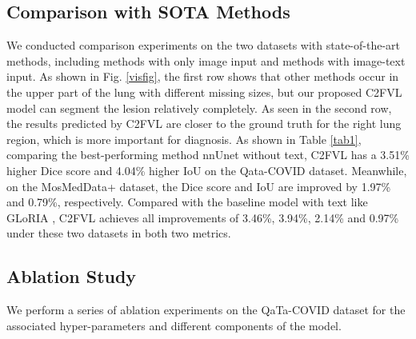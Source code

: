 \documentclass{article}
\begin{document}
\subsection{Comparison with SOTA Methods}
\vspace{-2mm}
We conducted comparison experiments on the two datasets with state-of-the-art methods, including methods with only image input and methods with image-text input. As shown in Fig. \ref{visfig}, the first row shows that other methods occur in the upper part of the lung with different missing sizes, but our proposed C2FVL model can segment the lesion relatively completely. As seen in the second row, the results predicted by C2FVL are closer to the ground truth for the right lung region, which is more important for diagnosis.
As shown in Table \ref{tab1}, comparing the best-performing method nnUnet without text, C2FVL has a 3.51\% higher Dice score and 4.04\% higher IoU on the Qata-COVID dataset. Meanwhile, on the MosMedData+ dataset, the Dice score and IoU are improved by 1.97\% and 0.79\%, respectively. Compared with the baseline model with text like GLoRIA \cite{huang2021gloria}, C2FVL achieves all improvements of 3.46\%, 3.94\%, 2.14\% and 0.97\% under these two datasets in both two metrics.



\vspace{-4mm}
\subsection{Ablation Study}
\vspace{-2mm}
We perform a series of ablation experiments on the QaTa-COVID dataset for the associated hyper-parameters and different components of the model.
\end{document}
